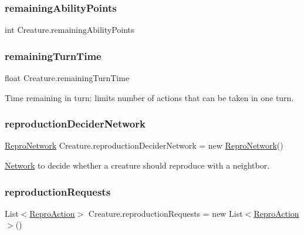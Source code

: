 \subsubsection{\texorpdfstring{remaining\+Ability\+Points}{remainingAbilityPoints}}
{\footnotesize\ttfamily int Creature.\+remaining\+Ability\+Points}

\mbox{\label{class_creature_a8542dd67a39f6badb8e83e45e0fa4ff3}} 
\subsubsection{\texorpdfstring{remaining\+Turn\+Time}{remainingTurnTime}}
{\footnotesize\ttfamily float Creature.\+remaining\+Turn\+Time}



Time remaining in turn\+: limits number of actions that can be taken in one turn. 

\mbox{\label{class_creature_a84614f4c93827ec6ba2754cd7cfa91e4}} 
\subsubsection{\texorpdfstring{reproduction\+Decider\+Network}{reproductionDeciderNetwork}}
{\footnotesize\ttfamily \mbox{\hyperlink{class_repro_network}{Repro\+Network}} Creature.\+reproduction\+Decider\+Network = new \mbox{\hyperlink{class_repro_network}{Repro\+Network}}()}



\mbox{\hyperlink{class_network}{Network}} to decide whether a creature should reproduce with a neightbor. 

\mbox{\label{class_creature_a8df2df30dc7d2da9705159e6425208d9}} 
\subsubsection{\texorpdfstring{reproduction\+Requests}{reproductionRequests}}
{\footnotesize\ttfamily List$<$\mbox{\hyperlink{class_repro_action}{Repro\+Action}}$>$ Creature.\+reproduction\+Requests = new List$<$\mbox{\hyperlink{class_repro_action}{Repro\+Action}}$>$()}




